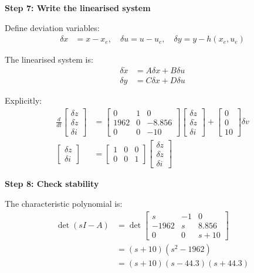 \documentclass[11pt,a4paper]{article}
\begin{document}
\textbf{Step 7: Write the linearised system}

Define deviation variables:
\begin{align}
\delta x &= x - x_e, \quad \delta u = u - u_e, \quad \delta y = y - h(x_e,u_e)
\end{align}

The linearised system is:
\begin{align}
\delta\dot{x} &= A\delta x + B\delta u\\
\delta y &= C\delta x + D\delta u
\end{align}

Explicitly:
\begin{align}
\frac{d}{dt}\begin{bmatrix}
\delta z\\
\delta\dot{z}\\
\delta i
\end{bmatrix} &= \begin{bmatrix}
0 & 1 & 0\\
1962 & 0 & -8.856\\
0 & 0 & -10
\end{bmatrix}\begin{bmatrix}
\delta z\\
\delta\dot{z}\\
\delta i
\end{bmatrix} + \begin{bmatrix}
0\\
0\\
10
\end{bmatrix}\delta v\\
\begin{bmatrix}
\delta z\\
\delta i
\end{bmatrix} &= \begin{bmatrix}
1 & 0 & 0\\
0 & 0 & 1
\end{bmatrix}\begin{bmatrix}
\delta z\\
\delta\dot{z}\\
\delta i
\end{bmatrix}
\end{align}

\textbf{Step 8: Check stability}

The characteristic polynomial is:
\begin{align}
\det(sI - A) &= \det\begin{bmatrix}
s & -1 & 0\\
-1962 & s & 8.856\\
0 & 0 & s+10
\end{bmatrix}\\
&= (s+10)(s^2 - 1962)\\
&= (s+10)(s - 44.3)(s + 44.3)
\end{align}
\end{document}
